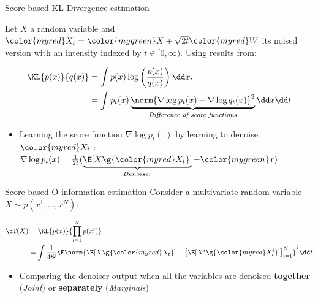 \begin{frame}{Score-based KL Divergence estimation}

Let $X$ a random variable and ${\color{myred}X_t}= {\color{mygreen}X} + \sqrt{2t} {\color{myred}W }$ its noised version with an intensity indexed by $t\in[0,\infty)$. Using results from\cite{minde}:

\begin{align*}
    \KL{p(x)}{q(x)} &= \int p(x)\log\left(\frac{p(x)}{q(x)}\right) \dd x. \\
   &= \int p_{t}(x) \underbrace{ \norm{\nabla \log p_{t}(x) - \nabla \log q_{t}(x) }^2}_{\textit{Difference of score functions}}\dd x\dd t
\end{align*}

\begin{itemize}
    \item Learning the score function $\nabla \log p_t(.) $ by learning to denoise ${\color{myred}X_t}$ : $\nabla \log{p_{t}(x)}=\frac{1}{2t}(\underbrace{\E[ X\g {\color{myred}X_t} ] }_{Denoiser}-{\color{mygreen}x} ) $
    
\end{itemize}
\end{frame}


\begin{frame}{Score-based O-information estimation}
Consider a multivariate random variable $X \sim p(x^1,\dots,x^N)$:

\begin{align*} 
\cT(X)&=  \KL{p(x)}{\prod\limits_{i=1}^N p(x^i)} \\
&= \int \frac{1}{4t^2}\E\norm{\E[X\g {\color{myred}X_t }]-
      \begin{bmatrix}
          \E[X^i\g {\color{myred}X^i_t }]
      \end{bmatrix}_{i=1}^{N}}^2\dd t   
\end{align*}

\begin{itemize}
\item Comparing the denoiser output when all the variables are denoised \textbf{together} (\textit{Joint}) or \textbf{separately} (\textit{Marginals})
\end{itemize}
\end{frame}

